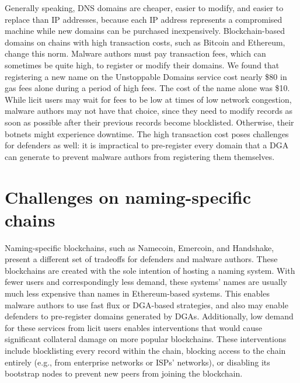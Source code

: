 Generally speaking, DNS domains are cheaper, easier to modify, and 
easier to replace than IP 
addresses, because each IP address represents a compromised machine while 
new domains can be 
purchased inexpensively. Blockchain-based domains on chains with high 
transaction costs, such as 
Bitcoin and Ethereum, change this norm. Malware authors must pay 
transaction fees, which can 
sometimes be quite high, to register or modify their domains. We found that 
registering a new name 
on the Unstoppable Domains service cost nearly \$80 in gas fees alone during a 
period of high fees. 
The cost of the name alone was \$10. While licit users may wait for fees to be 
low at times of low 
network congestion, malware authors may not have that choice, since they 
need to modify records as 
soon as possible after their previous records become blocklisted. Otherwise, 
their botnets might 
experience downtime. The high transaction cost poses challenges for 
defenders as well: it is 
impractical to pre-register every domain that a DGA can generate to prevent 
malware authors from 
registering them themselves. 


\section{Challenges on naming-specific chains}

Naming-specific blockchains, such as Namecoin, Emercoin, and Handshake, 
present 
a different set of tradeoffs for defenders and malware authors. These 
blockchains are created with the sole intention of hosting a naming system. 
With fewer users and correspondingly less demand, these systems' names are 
usually much less expensive than names in Ethereum-based systems. This enables 
malware 
authors to use fast flux or DGA-based strategies, and also may enable 
defenders 
to pre-register domains generated by DGAs. Additionally, low demand for 
these 
services from licit users enables interventions that would cause significant 
collateral damage on more popular blockchains. These interventions include 
blocklisting every record within the chain, blocking access to the chain 
entirely (e.g., from enterprise networks or ISPs' networks), or disabling 
its 
bootstrap nodes to prevent new peers from joining the blockchain.